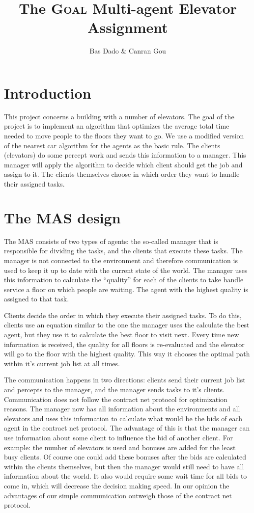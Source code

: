 \documentclass[a4paper,10pt,twocolumn]{article}
\title{The \textsc{Goal} Multi-agent Elevator Assignment}
\author{Bas Dado \& Canran Gou}
\begin{document}
\maketitle

\section{Introduction}
This project concerns a building with a number of elevators. The goal of the project is to implement an algorithm that optimizes the average total time needed to move people to the floors they want to go. We use a modified version of the nearest car algorithm for the agents as the basic rule. The clients (elevators) do some percept work and sends this information to a manager. This manager will apply the algorithm to decide which client should get the job and assign to it.
The clients themselves choose in which order they want to handle their assigned tasks.

\section{The MAS design}
The MAS consists of two types of agents: the so-called manager that is responsible for dividing the tasks, and the clients that execute these tasks. The manager is not connected to the environment and therefore communication is used to keep it up to date with the current state of the world. The manager uses this information  to calculate the ``quality'' for each of the clients to take handle service a floor on which people are waiting. The agent with the highest quality is assigned to that task. 

Clients decide the order in which they execute their assigned tasks. To do this, clients use an equation similar to the one the manager uses the calculate the best agent, but they use it to calculate the best floor to visit next. Every time new information is received, the quality for all floors is re-evaluated and the elevator will go to the floor with the highest quality. This way it chooses the optimal path within it's current job list at all times.

The communication happens in two directions: clients send their current job list and percepts to the manager, and the manager sends tasks to it's clients. Communication does not follow the contract net protocol for optimization reasons. The manager now has all information about the environments and all elevators and uses this information to calculate what would be the bids of each agent in the contract net protocol. The advantage of this is that the manager can use information about some client to influence the bid of another client. For example: the number of elevators is used and bonuses are added for the least busy clients. Of course one could add these bonuses after the bids are calculated within the clients themselves, but then the manager would still need to have all information about the world. It also would require some wait time for all bids to come in, which will decrease the decision making speed. In our opinion the advantages of our simple communication outweigh those of the contract net protocol.
\end{document}
